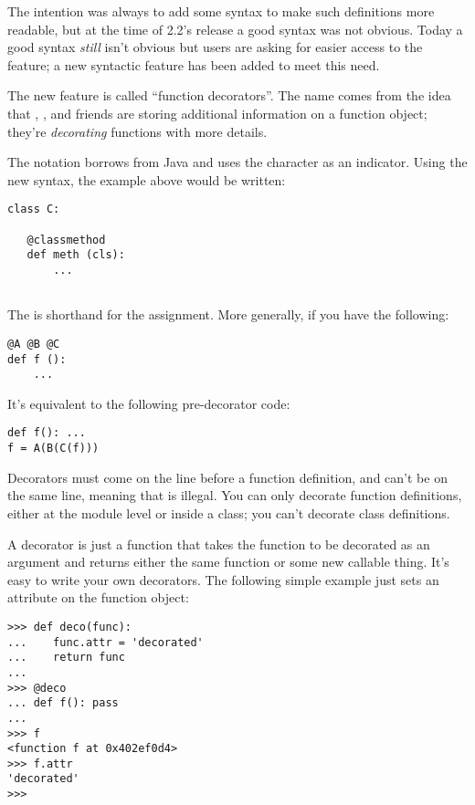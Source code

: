 \documentclass{howto}
\begin{document}
The intention was always to add some syntax to make such definitions
more readable, but at the time of 2.2's release a good syntax was not
obvious.  Today a good syntax \emph{still} isn't obvious but users are
asking for easier access to the feature; a new syntactic feature has
been added to meet this need.

The new feature is called ``function decorators''.  The name comes
from the idea that , ,
and friends are storing additional information on a function object;
they're \emph{decorating} functions with more details.

The notation borrows from Java and uses the  character as an
indicator.  Using the new syntax, the example above would be written:

\begin{verbatim}
class C:

   @classmethod
   def meth (cls):
       ...
   
\end{verbatim}

The  is shorthand for the
 assignment.  More generally, if you have
the following:

\begin{verbatim}
@A @B @C
def f ():
    ...
\end{verbatim}

It's equivalent to the following pre-decorator code:

\begin{verbatim}
def f(): ...
f = A(B(C(f)))
\end{verbatim}

Decorators must come on the line before a function definition, and
can't be on the same line, meaning that  is
illegal.  You can only decorate function definitions, either at the
module level or inside a class; you can't decorate class definitions.

A decorator is just a function that takes the function to be decorated
as an argument and returns either the same function or some new
callable thing.  It's easy to write your own decorators.  The
following simple example just sets an attribute on the function
object:

\begin{verbatim}
>>> def deco(func):
...    func.attr = 'decorated'
...    return func
...
>>> @deco
... def f(): pass
...
>>> f
<function f at 0x402ef0d4>
>>> f.attr
'decorated'
>>>
\end{verbatim}
\end{document}
